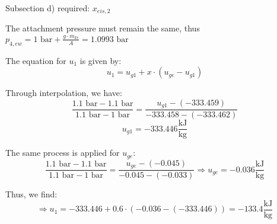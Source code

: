 Subsection d) required: \(x_{eis,2}\)

The attachment pressure must remain the same, thus \(p_{4,ew} = 1 \text{ bar} + \frac{g \cdot m_{kr}}{A} = 1.0993 \text{ bar}\)

The equation for \(u_1\) is given by:
\[
u_1 = u_{g1} + x \cdot (u_{ge} - u_{g1})
\]

Through interpolation, we have:
\[
\frac{1.1 \text{ bar} - 1.1 \text{ bar}}{1.1 \text{ bar} - 1 \text{ bar}} = \frac{u_{g1} - (-333.459)}{-333.458 - (-333.462)}
\]
\[
u_{g1} = -333.446 \frac{\text{kJ}}{\text{kg}}
\]

The same process is applied for \(u_{ge}\):
\[
\frac{1.1 \text{ bar} - 1.1 \text{ bar}}{1.1 \text{ bar} - 1 \text{ bar}} = \frac{u_{ge} - (-0.045)}{-0.045 - (-0.033)} \Rightarrow u_{ge} = -0.036 \frac{\text{kJ}}{\text{kg}}
\]

Thus, we find:
\[
\Rightarrow u_1 = -333.446 + 0.6 \cdot (-0.036 - (-333.446)) = -133.4 \frac{\text{kJ}}{\text{kg}}
\]